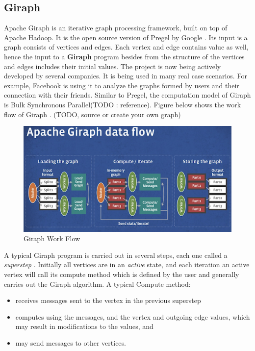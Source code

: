 \documentclass[english]{tktltiki}
\begin{document}
\subsection{Giraph}
Apache Giraph is an iterative graph processing framework, built on top of Apache Hadoop. It is the open source version of Pregel by Google \cite{malewicz10} . Its input is a graph consists of vertices and edges. Each vertex and edge contains value as well, hence the input to a \textbf{Giraph} program besides from the structure of the vertices and edges includes their initial values. The project is now being actively developed by several companies. It is being used in many real case scenarios. For example, Facebook is using it to analyze the graphs formed by users and their connection with their friends. Similar to Pregel, the computation model of Giraph is Bulk Synchronous Parallel(TODO : reference). 
Figure below shows the work flow of Giraph . (TODO, source or create your own graph)
\begin{figure}[ht!]
\centering
\includegraphics[width=130mm]{figures/giraphdataflow.png}
\caption{Giraph Work Flow}
\end{figure}
A typical Giraph program is carried out in several steps, each one called a \textit{superstep} . Initially all vertices are in an \textit{active} state, and each iteration an active vertex will call its compute method which is defined by the user and generally carries out the Giraph algorithm. A typical Compute method:
\begin{itemize}
\item
receives messages sent to the vertex in the previous superstep
\item
computes using the messages, and the vertex and outgoing edge values, which may result in modifications to the values, and
\item
may send messages to other vertices.
\end{itemize}
\end{document}
